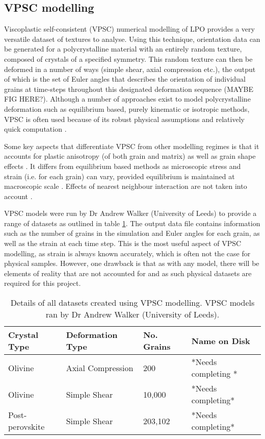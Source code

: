 \documentclass[a4paper,12pt]{report}
\numberwithin{equation}{chapter}
\begin{document}
\subsection{VPSC modelling}
Viscoplastic self-consistent (VPSC) numerical modelling of LPO \citep{Molinari1987,Lebensohn1993} provides a very versatile dataset of textures to analyse. Using this technique, orientation data can be generated for a polycrystalline material with an entirely random texture, composed of crystals of a specified symmetry. This random texture can then be deformed in a number of ways (simple shear, axial compression etc.), the output of which is the set of Euler angles that describes the orientation of individual grains at time-steps throughout this designated deformation sequence (MAYBE FIG HERE?). Although a number of approaches exist to model polycrystalline deformation such as equilibrium based, purely kinematic or isotropic methods, VPSC is often used because of its robust physical assumptions and relatively quick computation \citep[][and references therein]{Tommasi2000}. 

Some key aspects that differentiate VPSC from other modelling regimes is that it accounts for plastic anisotropy (of both grain and matrix) as well as grain shape effects \citep[as introduced by][]{Lebensohn1993}. It differs from equilibrium based methods as microscopic stress and strain (i.e. for each grain) can vary, provided equilibrium is maintained at macroscopic scale \citep{Tommasi2000}. Effects of nearest neighbour interaction are not taken into account \citep[see][for details]{Castelnau1996}.

VPSC models were run by Dr Andrew Walker (University of Leeds) to provide a range of datasets as outlined in table \ref{tab:VPSC_data}. The output data file contains information such as the number of grains in the simulation and Euler angles for each grain, as well as the strain at each time step. This is the most useful aspect of VPSC modelling, as strain is always known accurately, which is often not the case for physical samples. However, one drawback is that as with any model, there will be elements of reality that are not accounted for and as such physical datasets are required for this project.

\begin{table} 
	\centering
	\caption[VPSC datasets]{Details of all datasets created using VPSC modelling. VPSC models ran by Dr Andrew Walker (University of Leeds).\\}
\begin{tabularx}{\textwidth}{X X X X}
	\hline
	\hline
	Crystal Type    & Deformation Type  & No. Grains & Name on Disk \\
	\hline
	\hline
	Olivine         & Axial Compression & 200        & *Needs completing *    \\
	Olivine         & Simple Shear      & 10,000     & *Needs completing*    \\
	Post-perovskite & Simple Shear      & 203,102    & *Needs completing*    \\
	\hline
	\end{tabularx}
\label{tab:VPSC_data}
\end{table}
\end{document}
